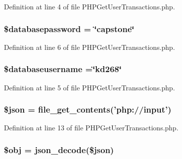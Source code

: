 Definition at line 4 of file P\-H\-P\-Get\-User\-Transactions.\-php.

\hypertarget{_p_h_p_get_user_transactions_8php_a1a07536b6a5f43f2d8f826bd2ee6c91a}{
\subsubsection[{\$databasepassword}]{\setlength{\rightskip}{0pt plus 5cm}\$databasepassword = \char`\"{}capstone\char`\"{}}}\label{_p_h_p_get_user_transactions_8php_a1a07536b6a5f43f2d8f826bd2ee6c91a}


Definition at line 6 of file P\-H\-P\-Get\-User\-Transactions.\-php.

\hypertarget{_p_h_p_get_user_transactions_8php_a251bf75f510d7c8b556c65d7c30e911f}{
\subsubsection[{\$databaseusername}]{\setlength{\rightskip}{0pt plus 5cm}\$databaseusername =\char`\"{}kd268\char`\"{}}}\label{_p_h_p_get_user_transactions_8php_a251bf75f510d7c8b556c65d7c30e911f}


Definition at line 5 of file P\-H\-P\-Get\-User\-Transactions.\-php.

\hypertarget{_p_h_p_get_user_transactions_8php_acedd13b51401130848ce18f4d5c52605}{
\subsubsection[{\$json}]{\setlength{\rightskip}{0pt plus 5cm}\$json = file\-\_\-get\-\_\-contents('php\-://input')}}\label{_p_h_p_get_user_transactions_8php_acedd13b51401130848ce18f4d5c52605}


Definition at line 13 of file P\-H\-P\-Get\-User\-Transactions.\-php.

\hypertarget{_p_h_p_get_user_transactions_8php_a9008ed94ba185855b1723e367744b87e}{
\subsubsection[{\$obj}]{\setlength{\rightskip}{0pt plus 5cm}\$obj = json\-\_\-decode(\$json)}}\label{_p_h_p_get_user_transactions_8php_a9008ed94ba185855b1723e367744b87e}


